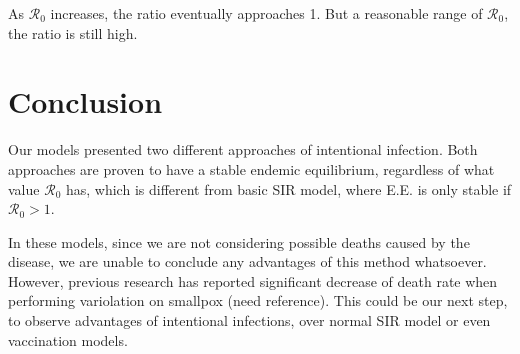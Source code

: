 \documentclass[12pt]{article}
\newcommand{\R}{\mathcal{R}}
\begin{document}
As $\R_0$ increases, the ratio eventually approaches 1. But a reasonable range of $\R_0$, the ratio is still high.

\section{Conclusion}
\begin{flushleft}
Our models presented two different approaches of intentional infection. Both approaches are proven to have a stable endemic equilibrium, regardless of what value $\R_0$ has, which is different from basic SIR model, where E.E. is only stable if $\R_0>1$.

In these models, since we are not considering possible deaths caused by the disease, we are unable to conclude any advantages of this method whatsoever. However, previous research has reported significant decrease of death rate when performing variolation on smallpox (need reference). This could be our next step, to observe advantages of intentional infections, over normal SIR model or even vaccination models.

\end{flushleft}
\end{document}
